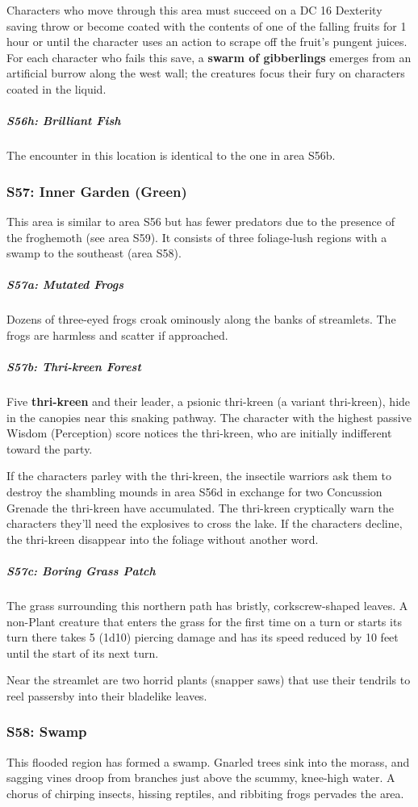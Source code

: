 \documentclass[10pt,a4paper,twoside,bg=print,twocolumn,openany,nodeprecatedcode]{dndbook}
\begin{document}
Characters who move through this area must succeed on a DC 16 Dexterity saving throw or become coated with the contents of one of the falling fruits for 1 hour or until the character uses an action to scrape off the fruit's pungent juices. For each character who fails this save, a \textbf{swarm of gibberlings} emerges from an artificial burrow along the west wall; the creatures focus their fury on characters coated in the liquid.

\subparagraph{S56h: Brilliant Fish}
The encounter in this location is identical to the one in area S56b.

\subsubsection{S57: Inner Garden (Green)}
This area is similar to area S56 but has fewer predators due to the presence of the froghemoth (see area S59). It consists of three foliage-lush regions with a swamp to the southeast (area S58).

\subparagraph{S57a: Mutated Frogs}
Dozens of three-eyed frogs croak ominously along the banks of streamlets. The frogs are harmless and scatter if approached.

\subparagraph{S57b: Thri-kreen Forest}
Five \textbf{thri-kreen} and their leader, a psionic thri-kreen (a variant thri-kreen), hide in the canopies near this snaking pathway. The character with the highest passive Wisdom (Perception) score notices the thri-kreen, who are initially indifferent toward the party.

If the characters parley with the thri-kreen, the insectile warriors ask them to destroy the shambling mounds in area S56d in exchange for two Concussion Grenade the thri-kreen have accumulated. The thri-kreen cryptically warn the characters they'll need the explosives to cross the lake. If the characters decline, the thri-kreen disappear into the foliage without another word.

\subparagraph{S57c: Boring Grass Patch}
The grass surrounding this northern path has bristly, corkscrew-shaped leaves. A non-Plant creature that enters the grass for the first time on a turn or starts its turn there takes 5 (1d10) piercing damage and has its speed reduced by 10 feet until the start of its next turn.

Near the streamlet are two horrid plants (snapper saws) that use their tendrils to reel passersby into their bladelike leaves.

\subsubsection{S58: Swamp}
\begin{DndReadAloud}{}
This flooded region has formed a swamp. Gnarled trees sink into the morass, and sagging vines droop from branches just above the scummy, knee-high water. A chorus of chirping insects, hissing reptiles, and ribbiting frogs pervades the area.

\end{DndReadAloud}
\end{document}
